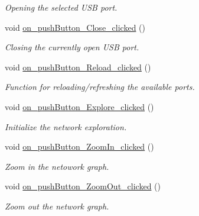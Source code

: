 \begin{DoxyCompactItemize}
\begin{DoxyCompactList}\small\item\em Opening the selected U\+SB port. \end{DoxyCompactList}\item 
\mbox{\label{classMainWindow_a7646bc6193d4ab29f4871e7ddb7d320a}} 
void \hyperlink{classMainWindow_a7646bc6193d4ab29f4871e7ddb7d320a}{on\+\_\+push\+Button\+\_\+\+Close\+\_\+clicked} ()
\begin{DoxyCompactList}\small\item\em Closing the currently open U\+SB port. \end{DoxyCompactList}\item 
\mbox{\label{classMainWindow_ab246b4bb1b03c40cf1282e968486aae5}} 
void \hyperlink{classMainWindow_ab246b4bb1b03c40cf1282e968486aae5}{on\+\_\+push\+Button\+\_\+\+Reload\+\_\+clicked} ()
\begin{DoxyCompactList}\small\item\em Function for reloading/refreshing the available ports. \end{DoxyCompactList}\item 
\mbox{\label{classMainWindow_a6de134a18b08532696095fad75d8b9e3}} 
void \hyperlink{classMainWindow_a6de134a18b08532696095fad75d8b9e3}{on\+\_\+push\+Button\+\_\+\+Explore\+\_\+clicked} ()
\begin{DoxyCompactList}\small\item\em Initialize the network exploration. \end{DoxyCompactList}\item 
\mbox{\label{classMainWindow_a30b56d6ecaaabe106f51dc385d64e38b}} 
void \hyperlink{classMainWindow_a30b56d6ecaaabe106f51dc385d64e38b}{on\+\_\+push\+Button\+\_\+\+Zoom\+In\+\_\+clicked} ()
\begin{DoxyCompactList}\small\item\em Zoom in the netowork graph. \end{DoxyCompactList}\item 
\mbox{\label{classMainWindow_a803d415d83e648d1c040d4474a978f28}} 
void \hyperlink{classMainWindow_a803d415d83e648d1c040d4474a978f28}{on\+\_\+push\+Button\+\_\+\+Zoom\+Out\+\_\+clicked} ()
\begin{DoxyCompactList}\small\item\em Zoom out the network graph. \end{DoxyCompactList}\item 

\end{DoxyCompactItemize}
